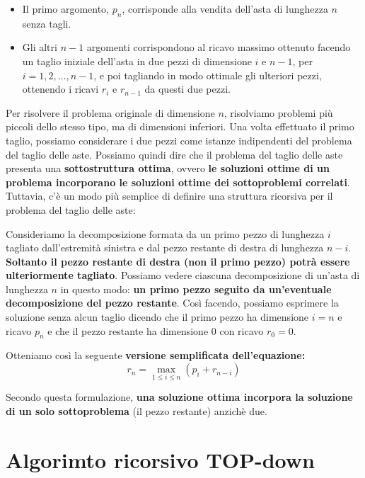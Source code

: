 \begin{itemize}
  \item
        Il primo argomento, $p_n$, corrisponde alla vendita dell'asta di
        lunghezza $n$ senza tagli.
  \item
        Gli altri $n-1$ argomenti corrispondono al ricavo massimo ottenuto
        facendo un taglio iniziale dell'asta in due pezzi di dimensione $i$
        e $n-1$, per $i = 1, 2, \ldots, n-1$, e poi tagliando in modo
        ottimale gli ulteriori pezzi, ottenendo i ricavi $r_i$ e $r_{n-1}$
        da questi due pezzi.
\end{itemize}

Per risolvere il problema originale di dimensione $n$,
risolviamo problemi più piccoli dello stesso tipo, ma di dimensioni
inferiori. Una volta effettuato il primo taglio, possiamo considerare i
due pezzi come istanze indipendenti del problema del taglio delle aste.
Possiamo quindi dire che il problema del taglio delle aste presenta una
\textbf{sottostruttura ottima}, ovvero \textbf{le soluzioni ottime di un
  problema incorporano le soluzioni ottime dei sottoproblemi correlati}.\\

Tuttavia, c'è un modo più semplice di definire una struttura ricorsiva
per il problema del taglio delle aste:
\begin{myblockquote}
  Consideriamo la decomposizione formata da un primo pezzo di lunghezza $i$
  tagliato dall'estremità sinistra e dal pezzo restante di destra di lunghezza
  $n-i$. \textbf{Soltanto il pezzo restante di destra (non il primo pezzo) potrà
    essere ulteriormente tagliato}. Possiamo vedere ciascuna decomposizione di
  un'asta di lunghezza $n$ in questo modo: \textbf{un primo pezzo seguito da
    un'eventuale decomposizione del pezzo restante}.  Così facendo, possiamo
  esprimere la soluzione senza alcun taglio dicendo che il primo pezzo ha
  dimensione $i = n$ e ricavo $p_n$ e che il pezzo restante ha dimensione 0 con
  ricavo $r_0 = 0$.
\end{myblockquote}

Otteniamo così la seguente \textbf{versione semplificata
  dell'equazione:}
$$
  r_n = \max_{1 \le i \le n}(p_i + r_{n-i})
$$

Secondo questa formulazione, \textbf{una soluzione ottima incorpora la
  soluzione di un solo sottoproblema} (il pezzo restante) anzichè due.

\section{Algorimto ricorsivo TOP-down}


